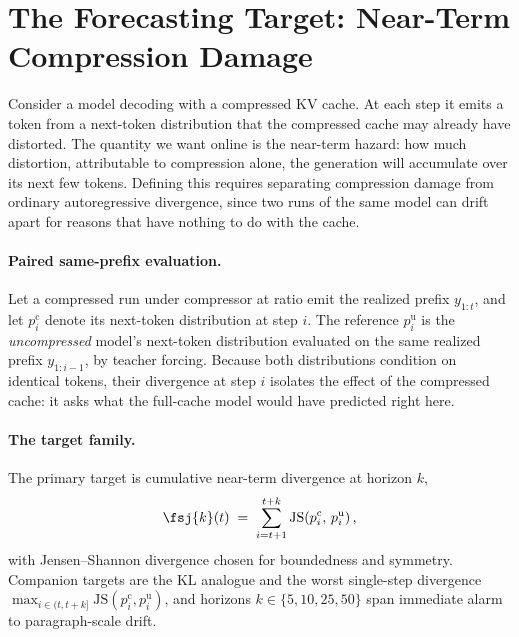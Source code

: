 \section{The Forecasting Target: Near-Term Compression Damage}
\label{sec:target}

Consider a model decoding with a compressed KV cache. At each step it emits a
token from a next-token distribution that the compressed cache may already
have distorted. The quantity we want online is the near-term hazard: how much
distortion, attributable to compression alone, the generation will accumulate
over its next few tokens. Defining this requires separating compression
damage from ordinary autoregressive divergence, since two runs of the same
model can drift apart for reasons that have nothing to do with the cache.

\paragraph{Paired same-prefix evaluation.}
Let a compressed run under compressor \compressor{} at ratio \ratio{} emit
the realized prefix $y_{1:t}$, and let $p^{\mathrm{c}}_{i}$ denote its
next-token distribution at step $i$. The reference $p^{\mathrm{u}}_{i}$ is
the \emph{uncompressed} model's next-token distribution evaluated on the same
realized prefix $y_{1:i-1}$, by teacher forcing. Because both distributions
condition on identical tokens, their divergence at step $i$ isolates the
effect of the compressed cache: it asks what the full-cache model would have
predicted right here.

\paragraph{The target family.}
The primary target is cumulative near-term divergence at horizon $k$,
\begin{equation}
\fsj{k}(t) \;=\; \sum_{i=t+1}^{t+k}
\mathrm{JS}\!\left(p^{\mathrm{c}}_{i},\, p^{\mathrm{u}}_{i}\right),
\label{eq:target}
\end{equation}
with Jensen--Shannon divergence chosen for boundedness and symmetry.
Companion targets are the KL analogue and the worst single-step divergence
$\max_{i \in (t, t+k]} \mathrm{JS}(p^{\mathrm{c}}_{i}, p^{\mathrm{u}}_{i})$,
and horizons $k \in \{5, 10, 25, 50\}$ span immediate alarm to
paragraph-scale drift. 

